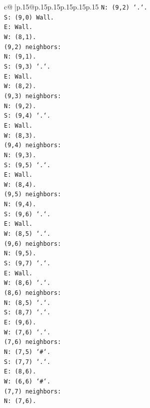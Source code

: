 \documentclass{article}
\begin{document}
{\begin{supertabular}{c@{$\;$}|p{.15\linewidth}@{}p{.15\linewidth}p{.15\linewidth}p{.15\linewidth}p{.15\linewidth}p{.15\linewidth}}
{{{\texttt{N: (9,2) `.`.} \\
\texttt{S: (9,0) Wall.} \\
\texttt{E: Wall.} \\
\texttt{W: (8,1).} \\
\texttt{(9,2) neighbors:} \\
\texttt{N: (9,1).} \\
\texttt{S: (9,3) `.`.} \\
\texttt{E: Wall.} \\
\texttt{W: (8,2).} \\
\texttt{(9,3) neighbors:} \\
\texttt{N: (9,2).} \\
\texttt{S: (9,4) `.`.} \\
\texttt{E: Wall.} \\
\texttt{W: (8,3).} \\
\texttt{(9,4) neighbors:} \\
\texttt{N: (9,3).} \\
\texttt{S: (9,5) `.`.} \\
\texttt{E: Wall.} \\
\texttt{W: (8,4).} \\
\texttt{(9,5) neighbors:} \\
\texttt{N: (9,4).} \\
\texttt{S: (9,6) `.`.} \\
\texttt{E: Wall.} \\
\texttt{W: (8,5) `.`.} \\
\texttt{(9,6) neighbors:} \\
\texttt{N: (9,5).} \\
\texttt{S: (9,7) `.`.} \\
\texttt{E: Wall.} \\
\texttt{W: (8,6) `.`.} \\
\texttt{(8,6) neighbors:} \\
\texttt{N: (8,5) `.`.} \\
\texttt{S: (8,7) `.`.} \\
\texttt{E: (9,6).} \\
\texttt{W: (7,6) `.`.} \\
\texttt{(7,6) neighbors:} \\
\texttt{N: (7,5) `\#`.} \\
\texttt{S: (7,7) `.`.} \\
\texttt{E: (8,6).} \\
\texttt{W: (6,6) `\#`.} \\
\texttt{(7,7) neighbors:} \\
\texttt{N: (7,6).} \\
}}}
\end{supertabular}}
\end{document}
